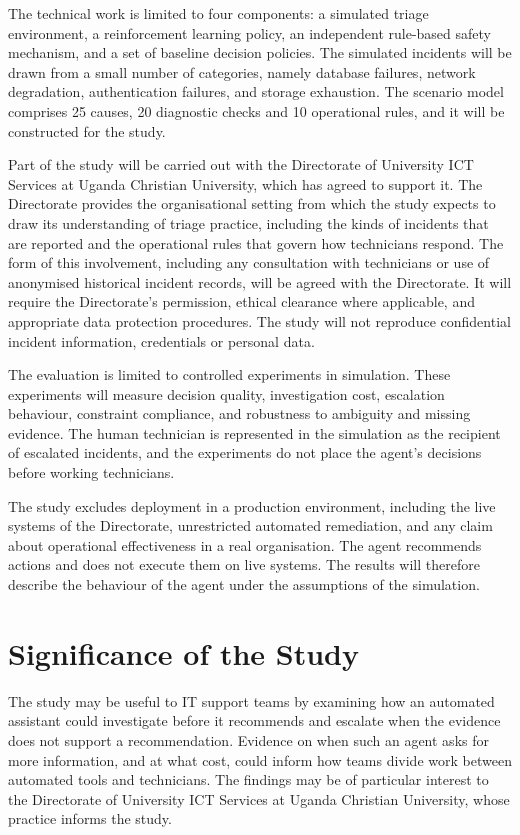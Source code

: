 \documentclass[12pt,a4paper]{article}
\begin{document}
The technical work is limited to four components: a simulated triage environment, a reinforcement learning policy, an independent rule-based safety mechanism, and a set of baseline decision policies. The simulated incidents will be drawn from a small number of categories, namely database failures, network degradation, authentication failures, and storage exhaustion. The scenario model comprises 25 causes, 20 diagnostic checks and 10 operational rules, and it will be constructed for the study.

Part of the study will be carried out with the Directorate of University ICT Services at Uganda Christian University, which has agreed to support it. The Directorate provides the organisational setting from which the study expects to draw its understanding of triage practice, including the kinds of incidents that are reported and the operational rules that govern how technicians respond. The form of this involvement, including any consultation with technicians or use of anonymised historical incident records, will be agreed with the Directorate. It will require the Directorate's permission, ethical clearance where applicable, and appropriate data protection procedures. The study will not reproduce confidential incident information, credentials or personal data.

The evaluation is limited to controlled experiments in simulation. These experiments will measure decision quality, investigation cost, escalation behaviour, constraint compliance, and robustness to ambiguity and missing evidence. The human technician is represented in the simulation as the recipient of escalated incidents, and the experiments do not place the agent's decisions before working technicians.

The study excludes deployment in a production environment, including the live systems of the Directorate, unrestricted automated remediation, and any claim about operational effectiveness in a real organisation. The agent recommends actions and does not execute them on live systems. The results will therefore describe the behaviour of the agent under the assumptions of the simulation.

\section{Significance of the Study}

The study may be useful to IT support teams by examining how an automated assistant could investigate before it recommends and escalate when the evidence does not support a recommendation. Evidence on when such an agent asks for more information, and at what cost, could inform how teams divide work between automated tools and technicians. The findings may be of particular interest to the Directorate of University ICT Services at Uganda Christian University, whose practice informs the study.
\end{document}
